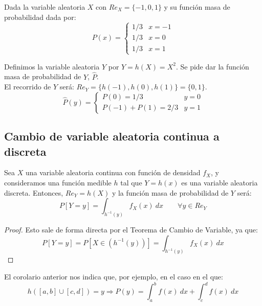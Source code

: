 \begin{ejemplo}
    Dada la variable aleatoria $X$ con $Re_X = \{-1, 0, 1\}$ y su función masa de probabilidad dada por:
    $$P(x) = \left\{ \begin{array}{cl}
        1/3 & x = -1 \\
        1/3 & x = 0  \\
        1/3 & x = 1
    \end{array} \right.$$
    
    
    Definimos la variable aleatoria $Y$ por $Y=h(X)=X^2$. Se pide dar la función masa de probabilidad de $Y$, $\hat{P}$.\\
    
    El recorrido de $Y$ será: $Re_Y = \{h(-1), h(0), h(1)\} = \{0, 1\}$.
    $$\hat{P}(y) = \left\{ \begin{array}{ll}
        P(0) = 1/3         & y = 0 \\
        P(-1) + P(1) = 2/3 & y = 1
      \end{array} \right.$$
\end{ejemplo}

\subsection{Cambio de variable aleatoria continua a discreta}

\begin{coro}
    Sea $X$ una variable aleatoria continua con función de densidad $f_X$, y consideramos una función medible $h$ tal que $Y=h(x)$ es una variable aleatoria discreta. Entonces, $Re_Y=h(X)$ y la función masa de probabilidad de $Y$ será:
    $$P[Y=y] = \int_{h^{-1}(y)} f_X(x)~dx \qquad \forall y \in Re_Y$$
\end{coro}
\begin{proof}
    Esto sale de forma directa por el Teorema de Cambio de Variable, ya que:
    $$P[Y=y] = P[X\in (h^{-1}(y))] = \int_{h^{-1}(y)} f_X(x)~dx$$
\end{proof}

El corolario anterior nos indica que, por ejemplo, en el caso en el que:
$$h([a,b] \cup [c,d]) = y \Rightarrow P(y) = \int_a^b f(x)~dx + \int_c^d f(x)~dx$$

